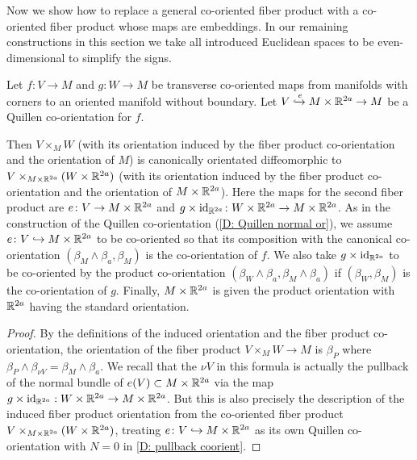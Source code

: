 Now we show how to replace a general co-oriented fiber product with a co-oriented fiber product whose maps are embeddings.
In our remaining constructions in this section we take all introduced Euclidean spaces to be even-dimensional to simplify the signs.

\begin{lemma}
	Let $f \colon V \to M$ and $g \colon W \to M$ be transverse co-oriented maps from manifolds with corners to an oriented manifold without boundary.
	Let $V\xhookrightarrow{e}M \times \mathbb{R}^{2a} \to M$ be a Quillen co-orientation for $f$.

	Then $V \times_M W$ (with its orientation induced by the fiber product co-orientation and the orientation of $M$) is canonically orientated diffeomorphic to $V\times_{M \times \mathbb{R}^{2a}}(W \times \mathbb{R}^{2a})$ (with its orientation induced by the fiber product co-orientation and the orientation of $M \times \mathbb{R}^{2a}$).
	Here the maps for the second fiber product are $e \colon V \to M \times \mathbb{R}^{2a}$ and $g \times \mathrm{id}_{\mathbb{R}^{2a}} \colon W \times \mathbb{R}^{2a} \to M \times \mathbb{R}^{2a}$.
	As in the construction of the Quillen co-orientation (\cref{D: Quillen normal or}), we assume $e \colon V \hookrightarrow M \times \mathbb{R}^{2a}$ to be co-oriented so that its composition with the canonical co-orientation $(\beta_{M}\wedge\beta_a,\beta_M)$ is the co-orientation of $f$.
	We also take $g \times \mathrm{id}_{\mathbb{R}^{2a}}$ to be co-oriented by the product co-orientation $(\beta_W \wedge \beta_a,\beta_M \wedge \beta_a)$ if $(\beta_W,\beta_M)$ is the co-orientation of $g$.
	Finally, $M \times \mathbb{R}^{2a}$ is given the product orientation with $\mathbb{R}^{2a}$ having the standard orientation.
\end{lemma}

\begin{proof}
	By the definitions of the induced orientation and the fiber product co-orientation, the orientation of the fiber product $V \times_M W \to M$ is $\beta_P$ where $\beta_P \wedge \beta_{\nu V} = \beta_M\wedge\beta_a$.
	We recall that the $\nu V$ in this formula is actually the pullback of the normal bundle of $e(V) \subset M \times \mathbb{R}^{2a}$ via the map $g \times \mathrm{id}_{\mathbb{R}^{2a}}: W \times \mathbb{R}^{2a} \to M \times \mathbb{R}^{2a}$.
	But this is also precisely the description of the induced fiber product orientation from the co-oriented fiber product $V\times_{M \times \mathbb{R}^{2a}}(W \times \mathbb{R}^{2a})$, treating $e \colon V \hookrightarrow M \times \mathbb{R}^{2a}$ as its own Quillen co-orientation with $N = 0$ in \cref{D: pullback coorient}.
\end{proof}

